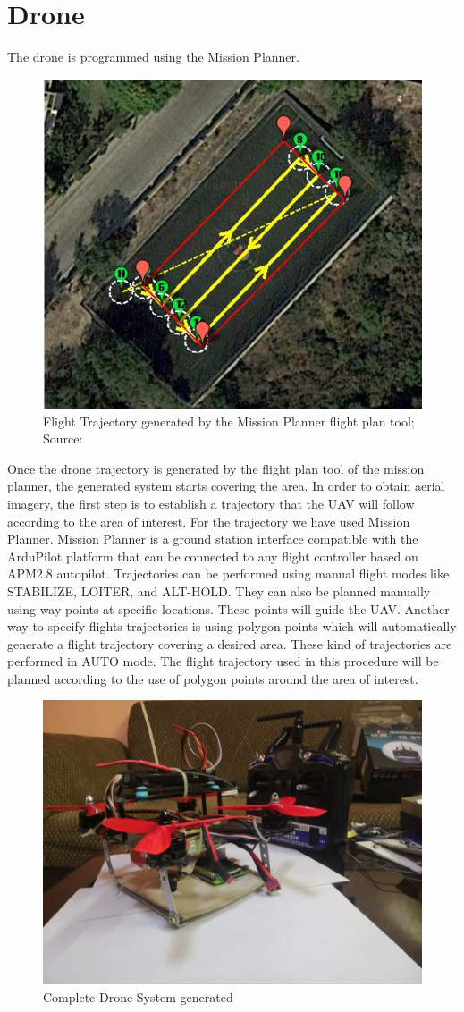 \section{Drone}
The drone is programmed using the Mission Planner. 
\begin{figure}[H]
    \centering
    \includegraphics[width=0.7\linewidth]{SummerInterReport/project/Images-Major/flightTraj.png}
    \caption{Flight Trajectory generated by the Mission Planner ﬂight plan tool; Source: \cite{one}}
    \label{fig:compEy}
\end{figure}
Once the drone trajectory is generated by the flight plan tool of the mission planner, the generated system starts covering the area. In order to obtain aerial imagery, the ﬁrst step is to establish a trajectory that the UAV will follow according to the area of interest. For the trajectory we have used Mission Planner. Mission Planner is a ground station interface compatible with the ArduPilot platform that can be connected to any ﬂight controller based on APM2.8 autopilot. Trajectories can be performed using manual ﬂight modes like STABILIZE, LOITER, and ALT-HOLD. They can also be planned manually using way points at speciﬁc locations. These points will guide the UAV. Another way to specify ﬂights trajectories is using polygon points which will automatically generate a ﬂight trajectory covering a desired area. These kind of trajectories are performed in AUTO mode. The ﬂight trajectory used in this procedure will be planned according to the use of polygon points around the area of interest. 
\begin{figure}[H]
    \centering
    \includegraphics[width=0.7\linewidth]{SummerInterReport/project/Images-Major/complete_drone.jpeg}
    \caption{Complete Drone System generated}
    \label{fig:compEy}
\end{figure}

